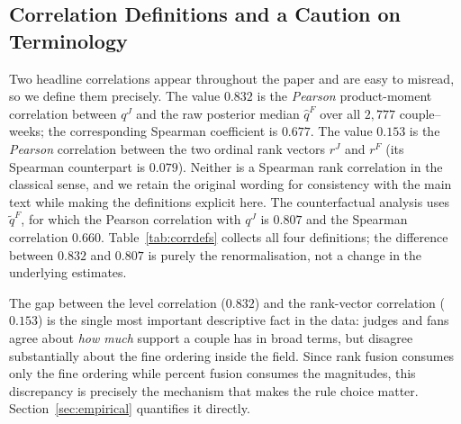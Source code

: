 \subsection{Correlation Definitions and a Caution on Terminology}

Two headline correlations appear throughout the paper and are easy to misread, so we define
them precisely. The value $\mathbf{0.832}$ is the \emph{Pearson} product-moment correlation
between $q^J$ and the raw posterior median $\hat q^F$ over all $2{,}777$ couple--weeks; the
corresponding Spearman coefficient is $0.677$. The value $\mathbf{0.153}$ is the \emph{Pearson}
correlation between the two ordinal rank vectors $r^J$ and $r^F$ (its Spearman counterpart is
$0.079$). Neither is a Spearman rank correlation in the classical sense, and we retain the
original wording for consistency with the main text while making the definitions explicit here.
The counterfactual analysis uses $\tilde q^F$, for which the Pearson correlation with $q^J$ is
$0.807$ and the Spearman correlation $0.660$. Table~\ref{tab:corrdefs} collects all four
definitions; the difference between $0.832$ and $0.807$ is purely the renormalisation, not a
change in the underlying estimates.



The gap between the level correlation ($0.832$) and the rank-vector correlation ($0.153$) is
the single most important descriptive fact in the data: judges and fans agree about \emph{how
much} support a couple has in broad terms, but disagree substantially about the fine ordering
inside the field. Since rank fusion consumes only the fine ordering while percent fusion consumes
the magnitudes, this discrepancy is precisely the mechanism that makes the rule choice matter.
Section~\ref{sec:empirical} quantifies it directly.


